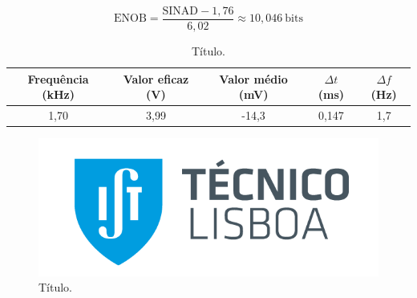 
\vspace*{-0.3cm}
\begin{equation}
    \text{ENOB} = \frac{\text{SINAD} - 1,76}{6,02} \approx 10,046\:\text{bits}
    \label{eq:exemplo}
\end{equation}


\begin{table}[H]
    \centering
    \caption{Título.}
    \label{tab:exemplo}
    \begin{tabular}{|c|c|c|c|c|}
    \hline
    \cellcolor[HTML]{EFEFEF} Frequência (kHz)   &  \cellcolor[HTML]{EFEFEF} Valor eficaz (V) & \cellcolor[HTML]{EFEFEF} Valor médio (mV) &\cellcolor[HTML]{EFEFEF} $\Delta t$ (ms) & \cellcolor[HTML]{EFEFEF} $\Delta f$ (Hz) \\ \hline
     1,70     & 3,99 & -14,3 & 0,147 & 1,7    \\ \hline
    \end{tabular}
\end{table}


\begin{figure}[H]
    \centering
    \includegraphics[scale = 0.6]{imagens/ist.png} 
    \caption{Título.}
    \label{fig:exemplo.1}
\end{figure}
\vspace*{-0.2cm}


